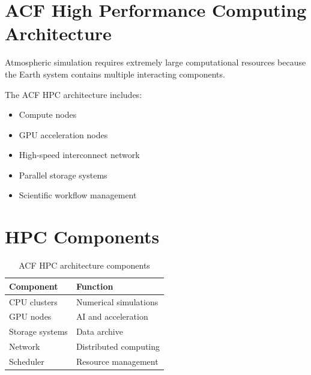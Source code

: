 \section{ACF High Performance Computing Architecture}


Atmospheric simulation requires extremely large computational
resources because the Earth system contains multiple interacting
components.



The ACF HPC architecture includes:


\begin{itemize}

\item Compute nodes

\item GPU acceleration nodes

\item High-speed interconnect network

\item Parallel storage systems

\item Scientific workflow management

\end{itemize}



\section{HPC Components}


\begin{table}[h]

\centering

\begin{tabular}{ll}

\toprule

Component & Function \\

\midrule

CPU clusters & Numerical simulations \\

GPU nodes & AI and acceleration \\

Storage systems & Data archive \\

Network & Distributed computing \\

Scheduler & Resource management \\

\bottomrule

\end{tabular}


\caption{ACF HPC architecture components}

\end{table}
